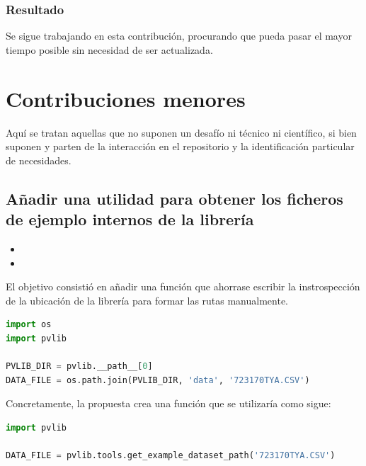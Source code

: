 \subsubsection{Resultado}

Se sigue trabajando en esta contribución, procurando que pueda pasar el mayor tiempo posible sin necesidad de ser actualizada.

\section{Contribuciones menores} \label{sct:desarrollo:contribuciones_menores}

Aquí se tratan aquellas que no suponen un desafío ni técnico ni científico, si bien suponen y parten de la interacción en el repositorio y la identificación particular de necesidades.

\subsection{Añadir una utilidad para obtener los ficheros de ejemplo internos de la librería}

\begin{itemize}
    \item {}
    \item {}
\end{itemize}

El objetivo consistió en añadir una función que ahorrase escribir la instrospección de la ubicación de la librería para formar las rutas manualmente.

\begin{lstlisting}[language=python, caption={Fragmento de código utilizado normalmente para obtener la ruta de los ficheros de la librería}, label={lst:example_files_current}]
import os
import pvlib

PVLIB_DIR = pvlib.__path__[0]
DATA_FILE = os.path.join(PVLIB_DIR, 'data', '723170TYA.CSV')
\end{lstlisting}

Concretamente, la propuesta crea una función que se utilizaría como sigue:

\begin{lstlisting}[language=python, caption={Fragmento de código utilizando la función propuesta para obtener la ruta de los ficheros de la librería}, label={lst:example_files_proposal}]
import pvlib

DATA_FILE = pvlib.tools.get_example_dataset_path('723170TYA.CSV')
\end{lstlisting}

